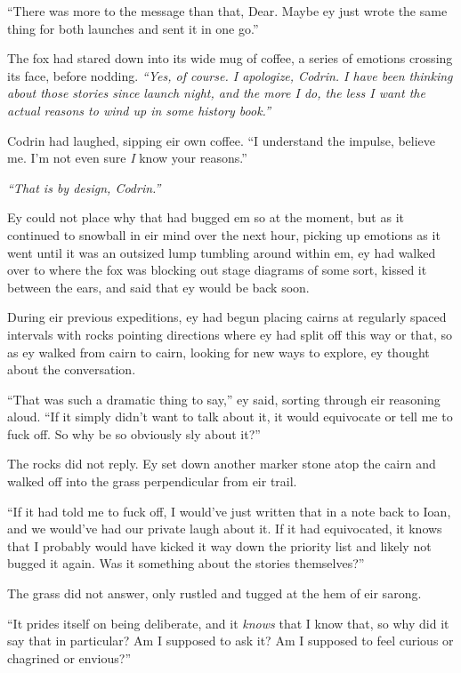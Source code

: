 ``There was more to the message than that, Dear. Maybe ey just wrote the same thing for both launches and sent it in one go.''

The fox had stared down into its wide mug of coffee, a series of emotions crossing its face, before nodding. \emph{``Yes, of course. I apologize, Codrin. I have been thinking about those stories since launch night, and the more I do, the less I want the actual reasons to wind up in some history book.''}

Codrin had laughed, sipping eir own coffee. ``I understand the impulse, believe me. I'm not even sure \emph{I} know your reasons.''

\emph{``That is by design, Codrin.''}

Ey could not place why that had bugged em so at the moment, but as it continued to snowball in eir mind over the next hour, picking up emotions as it went until it was an outsized lump tumbling around within em, ey had walked over to where the fox was blocking out stage diagrams of some sort, kissed it between the ears, and said that ey would be back soon.

During eir previous expeditions, ey had begun placing cairns at regularly spaced intervals with rocks pointing directions where ey had split off this way or that, so as ey walked from cairn to cairn, looking for new ways to explore, ey thought about the conversation.

``That was such a dramatic thing to say,'' ey said, sorting through eir reasoning aloud. ``If it simply didn't want to talk about it, it would equivocate or tell me to fuck off. So why be so obviously sly about it?''

The rocks did not reply. Ey set down another marker stone atop the cairn and walked off into the grass perpendicular from eir trail.

``If it had told me to fuck off, I would've just written that in a note back to Ioan, and we would've had our private laugh about it. If it had equivocated, it knows that I probably would have kicked it way down the priority list and likely not bugged it again. Was it something about the stories themselves?''

The grass did not answer, only rustled and tugged at the hem of eir sarong.

``It prides itself on being deliberate, and it \emph{knows} that I know that, so why did it say that in particular? Am I supposed to ask it? Am I supposed to feel curious or chagrined or envious?''

